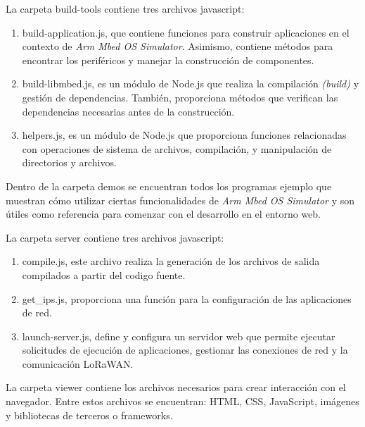 La carpeta \textquotedbl build-tools\textquotedbl{}  contiene tres archivos javascript: 

\begin{enumerate}
	\item build-application.js, que contiene funciones para construir aplicaciones en el contexto de \textit{Arm Mbed OS Simulator}. Asimismo, contiene métodos para encontrar los periféricos y manejar la construcción de componentes.
	
	\item build-libmbed.js, es un módulo de Node.js que realiza la compilación \textit{(build)} y gestión de dependencias. También, proporciona métodos que verifican las dependencias necesarias antes de la construcción.

	\item helpers.js,  es un módulo de Node.js que proporciona funciones relacionadas con operaciones de sistema de archivos, compilación, y manipulación de directorios y archivos.
\end{enumerate}
 
Dentro de la carpeta \textquotedbl demos\textquotedbl{}  se encuentran todos los programas ejemplo que muestran cómo utilizar ciertas funcionalidades de \textit{Arm Mbed OS Simulator} y son útiles como referencia para comenzar con el desarrollo en el entorno web. 
 
La carpeta \textquotedbl server\textquotedbl{}  contiene tres archivos javascript: 

\begin{enumerate}
	\item compile.js, este archivo realiza la generación de los archivos de salida compilados a partir del codigo fuente.
	
	\item get\_ips.js, proporciona una función para la configuración de las aplicaciones de red.

	\item launch-server.js, define y configura un servidor web que permite ejecutar solicitudes de ejecución de aplicaciones, gestionar las conexiones de red y la comunicación LoRaWAN.
	
\end{enumerate}
 
La carpeta \textquotedbl viewer\textquotedbl{}  contiene los archivos necesarios para crear interacción con el navegador. Entre estos archivos se encuentran: HTML, CSS, JavaScript, imágenes y bibliotecas de terceros o frameworks.
 
